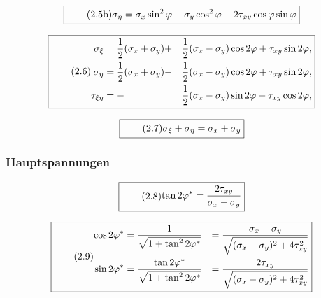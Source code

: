 \documentclass[11pt]{article}
\newcommand{\1}{ {\mathds{1}} }
\begin{document}
\begin{multicols}{2}
		\begin{equation}
			\boxed{
				\tag{2.5b}
				\begin{split}
					\sigma_{\eta}
					=
					\sigma_{x} \sin^2 \varphi + \sigma_y \cos^2 \varphi - 2 \tau_{xy} \cos\varphi\sin\varphi
				\end{split}
			}
		\end{equation}

		\begin{equation}
			\boxed{
				\tag{2.6}
				\begin{split}
					\sigma_{\xi} &= \frac{1}{2} (\sigma_x + \sigma_y) +&\frac{1}{2}(\sigma_x - \sigma_y) \cos 2 \varphi + \tau_{xy} \sin 2 \varphi, \\
					\sigma_{\eta} &= \frac{1}{2} (\sigma_x + \sigma_y) -&\frac{1}{2}(\sigma_x - \sigma_y) \cos 2 \varphi + \tau_{xy} \sin 2 \varphi,\\
					\tau_{\xi \eta} &= -&\frac{1}{2}(\sigma_x - \sigma_y) \sin 2 \varphi + \tau_{xy} \cos 2 \varphi,
				\end{split}
			}
		\end{equation}
		
		\begin{equation}
			\boxed{
				\tag{2.7}
				\begin{split}
					\sigma_\xi + \sigma_\eta
					=
					\sigma_x + \sigma_y
				\end{split}
			}
		\end{equation}

		\subsubsection{Hauptspannungen}
		
		\begin{equation}
			\boxed{
				\tag{2.8}
				\begin{split}
					\tan 2\varphi^\ast
					=
					\frac{2 \tau_{xy}}{\sigma_x - \sigma_y}
				\end{split}
			}
		\end{equation}

		\begin{equation}
			\boxed{
				\tag{2.9}
				\begin{split}
					\cos 2\varphi^\ast
					&=
					\frac{1}{\sqrt{1+ \tan^2 2\varphi^\ast}}
					&=
					\frac{\sigma_x - \sigma_y}{\sqrt{(\sigma_x - \sigma_y)^2 + 4 \tau_{xy}^2}} \\
					\sin 2\varphi^\ast
					&=
					\frac{\tan 2\varphi^\ast}{\sqrt{1+ \tan^2 2\varphi^\ast}}
					&=
					\frac{2\tau_{xy}}{\sqrt{(\sigma_x - \sigma_y)^2 + 4 \tau_{xy}^2}} \\					
				\end{split}
			}
		\end{equation}


\end{multicols}
\end{document}
